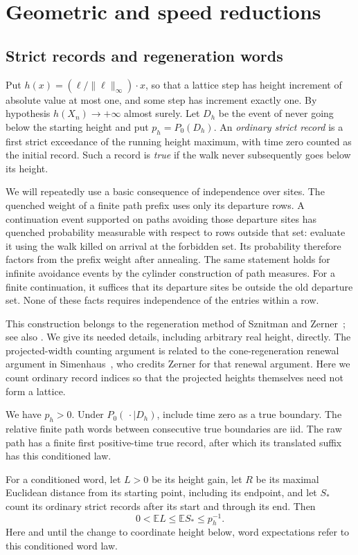 \section{Geometric and speed reductions}\label{sec:geometry}

\subsection{Strict records and regeneration words}

Put \(h(x)=(\ell/\|\ell\|_\infty)\cdot x\), so that a lattice step
has height increment of absolute value at most one, and some step has
increment exactly one. By hypothesis \(h(X_n)\to+\infty\) almost surely.
Let \(D_h\) be the event of never going below the starting height and put
\(p_h=P_0(D_h)\). An \emph{ordinary strict record} is a first strict
exceedance of the running height maximum, with time zero counted as the
initial record. Such a record is \emph{true} if the walk never subsequently
goes below its height.

We will repeatedly use a basic consequence of independence over sites.
The quenched weight of a finite path prefix uses only its departure rows.
A continuation event supported on paths avoiding those departure sites
has quenched probability measurable with respect to rows outside that set:
evaluate it using the walk killed on arrival at the forbidden set.
Its probability therefore factors from the prefix weight after annealing.
The same statement holds for infinite avoidance events by the cylinder
construction of path measures. For a finite continuation, it suffices
that its departure sites be outside the old departure set. None of these
facts requires independence of the entries within a row.

This construction belongs to the regeneration method of
Sznitman and Zerner~\cite{SznitmanZerner1999}; see also
\cite[Section~1]{Sznitman2002}. We give its needed
details, including arbitrary real height, directly.
The projected-width counting argument is related to the cone-regeneration
renewal argument in Simenhaus~\cite[Lemma~2]{Simenhaus2007}, who credits Zerner
for that renewal argument. Here we count ordinary record indices so that
the projected heights themselves need not form a lattice.

\begin{lemma}\label{geom-words}
We have \(p_h>0\). Under \(P_0(\,\cdot\mid D_h)\), include time zero as
a true boundary. The relative finite path words between consecutive true
boundaries are iid. The raw path has a finite first positive-time true
record, after which its translated suffix has this conditioned law.

For a conditioned word, let \(L>0\) be its height gain, let \(R\) be its
maximal Euclidean distance from its starting point, including its endpoint,
and let \(S_*\) count its ordinary strict records after its start and
through its end. Then
\[
0<\mathbb E L\le\mathbb E S_*\le p_h^{-1}.
\]
Here and until the change to coordinate height below, word expectations
refer to this conditioned word law.
\end{lemma}

